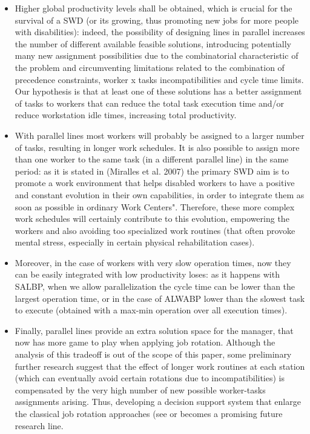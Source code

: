 \documentclass{singlecol-new}
\begin{document}
\begin{itemize}
	\item Higher global productivity levels shall be obtained, which is crucial for the survival of a SWD (or its growing, thus promoting new jobs for more people with disabilities): indeed, the possibility of designing lines in parallel increases the number of different available feasible solutions, introducing potentially many new assignment possibilities due to the combinatorial characteristic of the problem and circumventing limitations related to the combination of precedence constraints, worker x tasks incompatibilities and cycle time limits. Our hypothesis is that at least one of these solutions has a better assignment of tasks to workers that can reduce the total task execution time and/or reduce workstation idle times, increasing total productivity. 

	\item With parallel lines most workers will probably be assigned to a larger number of tasks, resulting in longer work schedules. It is also possible to assign more than one worker to the same task (in a different parallel line) in the same period: as it is stated in (Miralles et al. 2007) the primary SWD aim is to promote a work environment that helps disabled workers to have a positive and constant evolution in their own capabilities, in order to integrate them as soon as possible in ordinary Work Centers". Therefore, these more complex work schedules will certainly contribute to this evolution, empowering the workers and also avoiding too specialized work routines (that often provoke mental stress, especially in certain physical rehabilitation cases).
	\item Moreover, in the case of workers with very slow operation times, now they can be easily integrated with low productivity loses: as it happens with SALBP, when we allow parallelization the cycle time can be lower than the largest operation time, or in the case of ALWABP lower than the slowest task to execute (obtained with a max-min operation over all execution times).
	\item Finally, parallel lines provide an extra solution space for the manager, that now has more game to play when applying job rotation. Although the analysis of this tradeoff is out of the scope of this paper, some preliminary further research suggest that the effect of longer work routines at each station (which can eventually avoid certain rotations due to incompatibilities) is compensated by the very high number of new possible worker-tasks assignments arising. Thus, developing a decision support system that enlarge the classical job rotation approaches (see \cite{costa09job} or \cite{moreira12hybrid} becomes a promising future research line.
\end{itemize}
\end{document}
